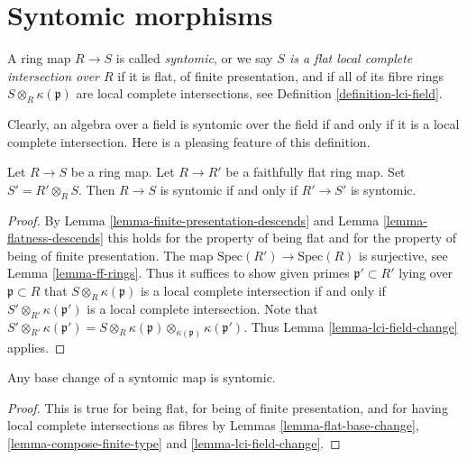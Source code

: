 \section{Syntomic morphisms}
\label{section-syntomic}

\begin{definition}
\label{definition-lci}
A ring map $R \to S$ is called {\it syntomic}, or we say {\it $S$ is a
flat local complete intersection over $R$}
if it is flat, of finite presentation, and if all of its fibre rings
$S \otimes_R \kappa(\mathfrak p)$ are local complete intersections,
see Definition \ref{definition-lci-field}.
\end{definition}

\noindent
Clearly, an algebra over a field is syntomic over the field
if and only if it is a local complete intersection. Here is
a pleasing feature of this definition.

\begin{lemma}
\label{lemma-syntomic-descends}
Let $R \to S$ be a ring map.
Let $R \to R'$ be a faithfully flat ring map.
Set $S' = R'\otimes_R S$.
Then $R \to S$ is syntomic if and only if $R' \to S'$ is syntomic.
\end{lemma}

\begin{proof}
By Lemma \ref{lemma-finite-presentation-descends} and
Lemma \ref{lemma-flatness-descends} this holds for the property
of being flat and for the property of being of finite presentation.
The map $\text{Spec}(R') \to \text{Spec}(R)$ is surjective,
see Lemma \ref{lemma-ff-rings}. Thus it suffices to show
given primes $\mathfrak p' \subset R'$ lying over $\mathfrak p \subset R$
that $S \otimes_R \kappa(\mathfrak p)$ is a local complete
intersection if and only if $S' \otimes_{R'} \kappa(\mathfrak p')$
is a local complete intersection. Note that
$S' \otimes_{R'} \kappa(\mathfrak p') =
S \otimes_R \kappa(\mathfrak p)
\otimes_{\kappa(\mathfrak p)} \kappa(\mathfrak p')$.
Thus Lemma \ref{lemma-lci-field-change} applies.
\end{proof}

\begin{lemma}
\label{lemma-base-change-syntomic}
Any base change of a syntomic map is syntomic.
\end{lemma}

\begin{proof}
This is true for being flat, for being of finite presentation,
and for having local complete intersections as fibres by
Lemmas \ref{lemma-flat-base-change}, \ref{lemma-compose-finite-type} and
\ref{lemma-lci-field-change}.
\end{proof}

